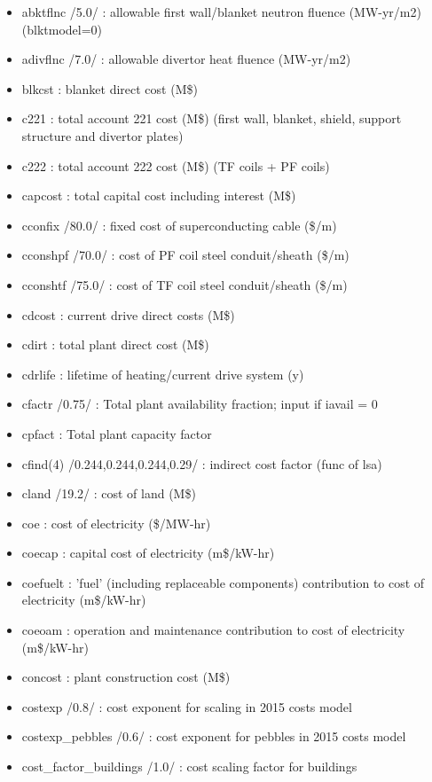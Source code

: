 \documentclass[]{article}
\providecommand{\tightlist}{%
  \setlength{\itemsep}{0pt}\setlength{\parskip}{0pt}}
\begin{document}
\begin{itemize}
\tightlist
\item
  abktflnc /5.0/ : allowable first wall/blanket neutron fluence
  (MW-yr/m2) (blktmodel=0)
\item
  adivflnc /7.0/ : allowable divertor heat fluence (MW-yr/m2)
\item
  blkcst : blanket direct cost (M\$)
\item
  c221 : total account 221 cost (M\$) (first wall, blanket, shield,
  support structure and divertor plates)
\item
  c222 : total account 222 cost (M\$) (TF coils + PF coils)
\item
  capcost : total capital cost including interest (M\$)
\item
  cconfix /80.0/ : fixed cost of superconducting cable (\$/m)
\item
  cconshpf /70.0/ : cost of PF coil steel conduit/sheath (\$/m)
\item
  cconshtf /75.0/ : cost of TF coil steel conduit/sheath (\$/m)
\item
  cdcost : current drive direct costs (M\$)
\item
  cdirt : total plant direct cost (M\$)
\item
  cdrlife : lifetime of heating/current drive system (y)
\item
  cfactr /0.75/ : Total plant availability fraction; input if iavail = 0
\item
  cpfact : Total plant capacity factor
\item
  cfind(4) /0.244,0.244,0.244,0.29/ : indirect cost factor (func of lsa)
\item
  cland /19.2/ : cost of land (M\$)
\item
  coe : cost of electricity (\$/MW-hr)
\item
  coecap : capital cost of electricity (m\$/kW-hr)
\item
  coefuelt : 'fuel' (including replaceable components) contribution to
  cost of electricity (m\$/kW-hr)
\item
  coeoam : operation and maintenance contribution to cost of electricity
  (m\$/kW-hr)
\item
  concost : plant construction cost (M\$)
\item
  costexp /0.8/ : cost exponent for scaling in 2015 costs model
\item
  costexp\_pebbles /0.6/ : cost exponent for pebbles in 2015 costs model
\item
  cost\_factor\_buildings /1.0/ : cost scaling factor for buildings

\end{itemize}
\end{document}
